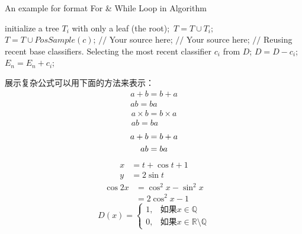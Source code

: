 \documentclass[12pt]{article}
\begin{document}
\begin{algorithm}[h]
    \caption{An example for format For \& While Loop in Algorithm}
    \label{alg:4}
    \begin{algorithmic}[1]
            \STATE initialize a tree $T_{i}$ with only a leaf (the root);\
            \STATE $T=T \cup T_{i};$\
        \ENDFOR
            \STATE $T=T \cup PosSample(c)$;
        \ENDFOR
            \STATE $//$ Your source here;
        \ENDFOR
            \STATE $//$ Your source here;
        \ENDFOR
            \STATE $//$ Reusing recent base classifiers.
            \STATE Selecting the most recent classifier $c_i$ from $D$;
            \STATE $D=D-c_i$;
            \STATE $E_n=E_n+c_i$;
        \ENDWHILE
    \end{algorithmic}
\end{algorithm}
\clearpage
\songti{}展示复杂公式可以用下面的方法来表示：
\begin{gather}    %
	a+b=b+a\\
	ab=ba
\end{gather}
\begin{gather*}    %
a \times b=b \times a\\
ab=ba   
\end{gather*}
\begin{gather}    %
a+b=b+a \notag \\    %
ab=ba   \notag     %
\end{gather}
\begin{align}
	x &= t + \cos t + 1\\
	y &= 2\sin t
\end{align}
\begin{equation}
	\begin{split}
	\cos 2x &= \cos^2 x - \sin^2 x\\
	&= 2\cos^2 x - 1
	\end{split}
\end{equation}
\begin{equation}
	D(x) = \begin{cases}
	1, &\text{如果} x \in \mathbb{Q}\\    %
	0, &\text{如果} x \in \mathbb{R}\setminus\mathbb{Q}	
		   \end{cases}    %
\end{equation}
\end{document}
